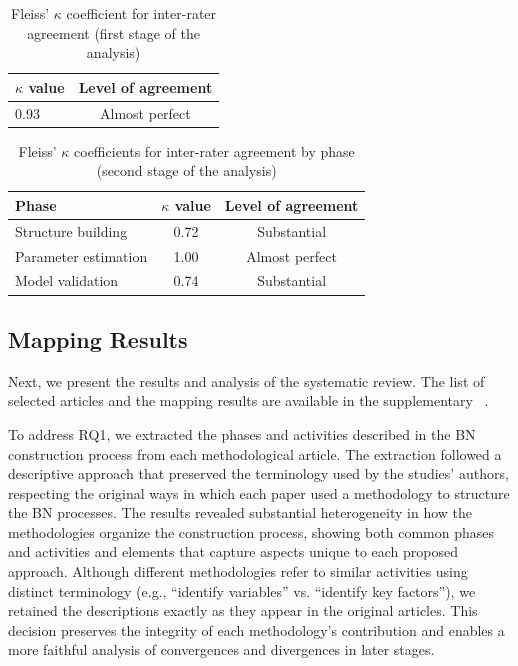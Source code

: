 \begin{table}[t]
\caption{Fleiss' $\kappa$ coefficient for inter-rater agreement (first stage of the analysis)}
\label{tab:fleiss_kappa_stage1}
\centering
\small
\renewcommand{\arraystretch}{1.15}
\setlength{\tabcolsep}{10pt}

\begin{tabular}{lc}
\toprule
\textbf{$\kappa$ value} & \textbf{Level of agreement} \\
\midrule
0.93 & Almost perfect \\
\bottomrule
\end{tabular}
\end{table}

\begin{table}[t]
\caption{Fleiss' $\kappa$ coefficients for inter-rater agreement by phase (second stage of the analysis)}
\label{tab:fleiss_kappa_stage2}
\centering
\small
\renewcommand{\arraystretch}{1.15}
\setlength{\tabcolsep}{10pt}

\begin{tabular}{lcc}
\toprule
\textbf{Phase} & \textbf{$\kappa$ value} & \textbf{Level of agreement} \\
\midrule
Structure building     & 0.72 & Substantial \\
Parameter estimation  & 1.00 & Almost perfect \\
Model validation      & 0.74 & Substantial \\
\bottomrule
\end{tabular}
\end{table}

\subsection{Mapping Results}

Next, we present the results and analysis of the systematic review. The list of selected articles and the mapping results are available in the supplementary ~\cite{rique2026supplementary}.



To address RQ1, we extracted the phases and activities described in the BN construction process from each methodological article. The extraction followed a descriptive approach that preserved the terminology used by the studies' authors, respecting the original ways in which each paper used a methodology to structure the BN processes. The results revealed substantial heterogeneity in how the methodologies organize the construction process, showing both common phases and activities and elements that capture aspects unique to each proposed approach. Although different methodologies refer to similar activities using distinct terminology (e.g., ``identify variables'' vs. ``identify key factors''), we retained the descriptions exactly as they appear in the original articles. This decision preserves the integrity of each methodology's contribution and enables a more faithful analysis of convergences and divergences in later stages.

